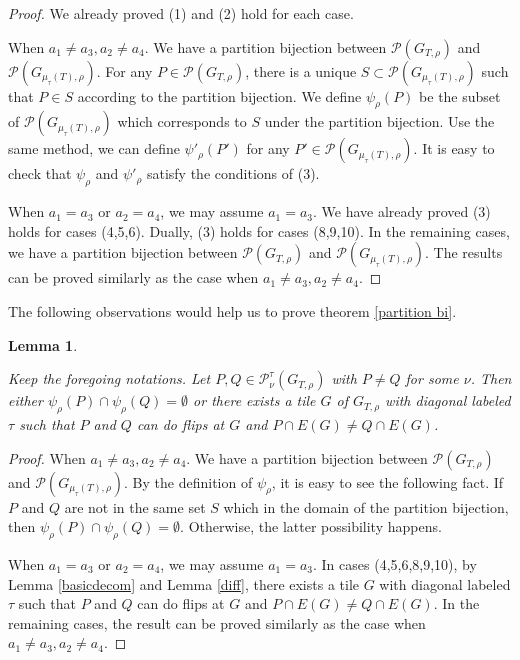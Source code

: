 \documentclass[10pt]{amsart}
\theoremstyle{theorems}
\newtheorem{Lemma}[Theorem]{Lemma}
\begin{document}
\begin{proof}

We already proved (1) and (2) hold for each case.

When $a_1\neq a_3, a_2\neq a_4$. We have a partition bijection between $\mathcal P(G_{T,\rho})$ and $\mathcal P(G_{\mu_{\tau}(T),\rho})$. For any $P\in\mathcal P(G_{T,\rho})$, there is a unique $S\subset \mathcal P(G_{\mu_{\tau}(T),\rho})$ such that $P\in S$ according to the partition bijection. We define $\psi_{\rho}(P)$ be the subset of $\mathcal P(G_{\mu_{\tau}(T),\rho})$ which corresponds to $S$ under the partition bijection. Use the same method, we can define $\psi'_{\rho}(P')$ for any $P'\in \mathcal P(G_{\mu_{\tau}(T),\rho})$. It is easy to check that $\psi_{\rho}$ and $\psi'_{\rho}$ satisfy the conditions of (3).

When $a_1=a_3$ or $a_2=a_4$, we may assume $a_1=a_3$. We have already proved (3) holds for cases (4,5,6). Dually, (3) holds for cases (8,9,10). In the remaining cases, we have a partition bijection between $\mathcal P(G_{T,\rho})$ and $\mathcal P(G_{\mu_{\tau}(T),\rho})$. The results can be proved similarly as the case when $a_1\neq a_3,a_2\neq a_4$.
\end{proof}

\medskip

The following observations would help us to prove theorem \ref{partition bi}.

\medskip

\begin{Lemma}\label{diff2}

Keep the foregoing notations. Let $P,Q\in \mathcal P^{\tau}_{\nu}(G_{T,\rho})$ with $P\neq Q$ for some $\nu$. Then either $\psi_{\rho}(P)\cap \psi_{\rho}(Q)=\emptyset$ or there exists a tile $G$ of $G_{T,\rho}$ with diagonal labeled $\tau$ such that $P$ and $Q$ can do flips at $G$ and $P\cap E(G)\neq Q\cap E(G)$.

\end{Lemma}

\begin{proof}

When $a_1\neq a_3, a_2\neq a_4$. We have a partition bijection between $\mathcal P(G_{T,\rho})$ and $\mathcal P(G_{\mu_{\tau}(T),\rho})$. By the definition of $\psi_{\rho}$, it is easy to see the following fact. If $P$ and $Q$ are not in the same set $S$ which in the domain of the partition bijection, then $\psi_{\rho}(P)\cap \psi_{\rho}(Q)=\emptyset$. Otherwise, the latter possibility happens.

When $a_1= a_3$ or $a_2= a_4$, we may assume $a_1=a_3$. In cases (4,5,6,8,9,10), by Lemma \ref{basicdecom} and Lemma \ref{diff}, there exists a tile $G$ with diagonal labeled $\tau$ such that $P$ and $Q$ can do flips at $G$ and $P\cap E(G)\neq Q\cap E(G)$. In the remaining cases, the result can be proved similarly as the case when $a_1\neq a_3, a_2\neq a_4$.
\end{proof}
\end{document}
